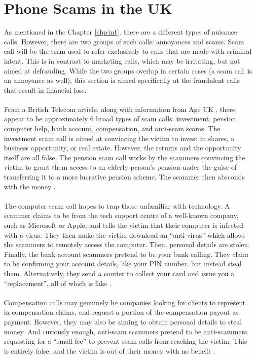 \documentclass[main.tex]{subfiles}
\begin{document}
\section{Phone Scams in the UK}\label{sec:scams}
As mentioned in the Chapter \ref{chp:int}, there are a different types of nuisance calls. However, there are two groups of such calls: annoyances and scams. Scam call will be the term used to refer exclusively to calls that are made with criminal intent. This is in contrast to marketing calls, which may be irritating, but not aimed at defrauding. While the two groups overlap in certain cases (a scam call is an annoyance as well), this section is aimed specifically at the fraudulent calls that result in financial loss.
\\\\
From a British Telecom \cite{bt-types} article, along with information from Age UK \cite{ageuk}, there appear to be approximately 6 broad types of scam calls: investment, pension, computer help, bank account, compensation, and anti-scam scams. The investment scam call is aimed at convincing the victim to invest in shares, a business opportunity, or real estate. However, the returns and the opportunity itself are all false. The pension scam call works by the scammers convincing the victim to grant them access to an elderly person's pension under the guise of transferring it to a more lucrative pension scheme. The scammer then absconds with the money \cite{bt-types}.
\\\\
The computer scam call hopes to trap those unfamiliar with technology. A scammer claims to be from the tech support centre of a well-known company, such as Microsoft or Apple, and tells the victim that their computer is infected with a virus. They then make the victim download an ``anti-virus'' which allows the scammers to remotely access the computer. Then, personal details are stolen. Finally, the bank account scammers pretend to be your bank calling. They claim to be confirming your account details, like your PIN number, but instead steal them. Alternatively, they send a courier to collect your card and issue you a ``replacement'', all of which is fake \cite{bt-types}.
\\\\
Compensation calls may genuinely be companies looking for clients to represent in compensation claims, and request a portion of the compensation payout as payment. However, they may also be aiming to obtain personal details to steal money. And curiously enough, anti-scam scammers pretend to be anti-scammers requesting for a ``small fee'' to prevent scam calls from reaching the victim. This is entirely false, and the victim is out of their money with no benefit \cite{ageuk}.
\end{document}
